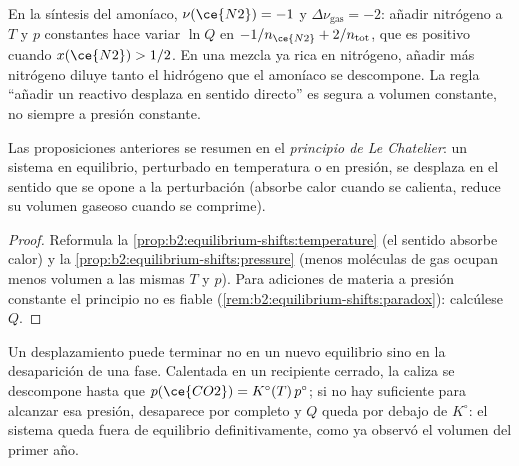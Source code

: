 \begin{remark}\label{rem:b2:equilibrium-shifts:paradox}
En la síntesis del amoníaco, $\nu(\ce{N2}) = -1$ y $\Delta\nu_{\text{gas}} = -2$:
añadir nitrógeno a $T$ y $p$ constantes hace variar $\ln Q$ en $-1/n_{\ce{N2}} +
2/n_{\text{tot}}$, que es positivo cuando $x(\ce{N2}) > 1/2$. En una mezcla
ya rica en nitrógeno, añadir más nitrógeno diluye tanto el hidrógeno
que el amoníaco se descompone. La regla ``añadir un reactivo desplaza en sentido directo'' es segura
a volumen constante, no siempre a presión constante.
\end{remark}

\begin{proposition}\label{prop:b2:equilibrium-shifts:le-chatelier}
Las proposiciones anteriores se resumen en el \emph{principio de Le
Chatelier}: un sistema en equilibrio,
perturbado en temperatura o en presión, se desplaza en el sentido que se opone a
la perturbación (absorbe calor cuando se calienta, reduce su volumen gaseoso cuando se
comprime).
\end{proposition}

\begin{proof}
Reformula la \cref{prop:b2:equilibrium-shifts:temperature} (el sentido
 absorbe calor) y la \cref{prop:b2:equilibrium-shifts:pressure} (menos
moléculas de gas ocupan menos volumen a las mismas $T$ y $p$). Para adiciones de
materia a presión constante el principio no es fiable
(\cref{rem:b2:equilibrium-shifts:paradox}): calcúlese $Q$.
\end{proof}

\begin{remark}\label{rem:b2:equilibrium-shifts:rupture}
Un desplazamiento puede terminar no en un nuevo equilibrio sino en la desaparición de una fase.
Calentada en un recipiente cerrado, la caliza se descompone hasta que $p(\ce{CO2}) =
K^\circ(T)\,p^\circ$; si no hay suficiente para alcanzar esa presión,
desaparece por completo y $Q$ queda por debajo de $K^\circ$: el sistema queda fuera de
equilibrio definitivamente, como ya observó el volumen del primer año.
\end{remark}

